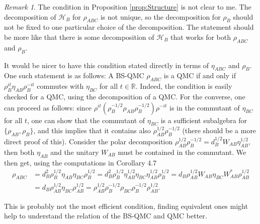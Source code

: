 \documentclass[12pt]{article}
\theoremstyle{definition}
\theoremstyle{remark}
\newtheorem{remark}{Remark}
\begin{document}
\begin{remark}
The condition in Proposition \ref{prop:Structure} is not clear to me. The decomposition of
$\mathcal{H}_B$ for $\rho_{ABC}$ is not unique, so the decomposition for $\rho_B$ should
not be fixed to one particular choice of the decomposition. The statement should be more
like that there is some decomposition of $\mathcal {H}_B$ that works for both $\rho_{ABC}$ and
$\rho_B$.  

It would be nicer to have this condition stated directly in terms of $\eta_{ABC}$ and
$\rho_B$. One such statement is as follows: A  BS-QMC $\rho_{ABC}$ is a QMC if and only if $\rho_B^{it}\eta_{AB}\rho_B^{-it}$
commutes with $\eta_{BC}$ for all $t\in \mathbb R$. Indeed, the condition is easily
checked for a QMC, using the decomposition of a QMC. For the converse, one can proceed as
follows: since $\rho^{it}(\rho_B^{-1/2}\rho_{AB}\rho_B^{-1/2})\rho^{-it}$ is in the
commutant of $\eta_{BC}$ for all $t$, one can show that the commutant of $\eta_{BC}$ is a
sufficient subalgebra for $\{\rho_{AB},\rho_B\}$, and this implies that
it contains also $\rho_{AB}^{1/2}\rho_B^{-1/2}$ (there should be  a more direct proof of
this).  Consider the polar decomposition
$\rho_{AB}^{1/2}\rho_B^{-1/2}=d_B^{1/2}W_{AB}\eta_{AB}^{1/2}$, then both $\eta_{AB}$ and  the unitary
$W_{AB}$ must be contained in the commutant. We then get, using the computations in
Corollary 4.7
\begin{align*}
\rho_{ABC}&=d_B^2\rho_{B}^{1/2}\eta_{AB}\eta_{BC}\rho_B^{1/2}=d_B^2\rho_{B}^{1/2}\eta^{1/2}_{AB}\eta_{BC}\eta^{1/2}_{AB}\rho_B^{1/2}=d_B\rho_{AB}^{1/2}W_{AB}\eta_{BC}W_{AB}^*\rho_{AB}^{1/2}\\
&=d_B\rho_{AB}^{1/2}\eta_{BC}\rho_{AB}^{1/2}=\rho_{AB}^{1/2}\rho_B^{-1/2}\rho_{BC}\rho_B^{-1/2}\rho_{AB}^{1/2}.
\end{align*}

This is probably not the most efficient condition, finding equivalent ones might help to
understand the relation of the BS-QMC and QMC better.


\end{remark}
\end{document}
